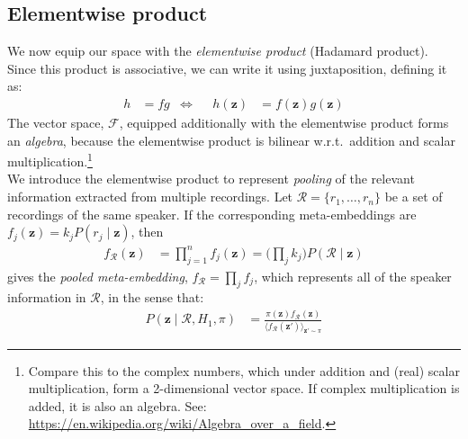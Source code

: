 \documentclass[a4paper,oneside,12pt,english]{report}
\def\zvec{\mathbf{z}}
\def\expv#1#2{\bigl\langle#1\bigr\rangle_{#2}}
\def\Rset{\mathcal{R}}
\def\Fset{\mathcal{F}}
\begin{document}
\subsection{Elementwise product}
\def\onevec{\boldsymbol{1}}
We now equip our space with the \emph{elementwise product} (Hadamard product). Since this product is associative, we can write it using juxtaposition, defining it as:
\begin{align}
h &= fg & \Leftrightarrow && h(\zvec) &= f(\zvec)g(\zvec) 
\end{align}
The vector space, $\Fset$, equipped additionally with the elementwise product forms an \emph{algebra}, because the elementwise product is bilinear w.r.t.\ addition and scalar multiplication.\footnote{Compare this to the complex numbers, which under addition and (real) scalar multiplication, form a 2-dimensional vector space. If complex multiplication is added, it is also an algebra. See: \url{https://en.wikipedia.org/wiki/Algebra_over_a_field}. }  \\

\noindent We introduce the elementwise product to represent \emph{pooling} of the relevant information extracted from multiple recordings. Let $\Rset=\{r_1,\ldots,r_n\}$ be a set of recordings of the same speaker. If the corresponding meta-embeddings are $f_j(\zvec)=k_jP(r_j\mid\zvec)$, then 
\begin{align}
f_\Rset(\zvec) &= \prod_{j=1}^n f_j(\zvec) = \bigl(\prod_j k_j\bigr) P(\Rset\mid\zvec) 
\end{align}
gives the \emph{pooled meta-embedding}, $f_\Rset = \prod_j f_j$, which represents all of the speaker information in $\Rset$, in the sense that:
\begin{align}
\label{eq:postR}
P(\zvec\mid\Rset,H_1,\pi) &= \frac{\pi(\zvec)f_\Rset(\zvec)}{\expv{f_\Rset(\zvec')}{\zvec'\sim\pi}}
\end{align}
\end{document}
